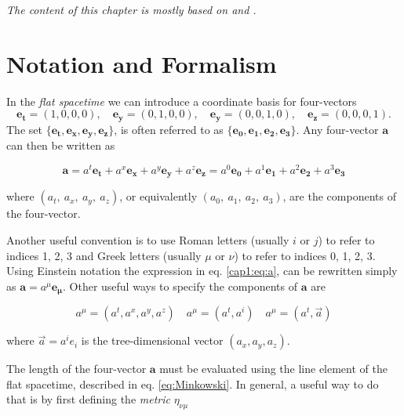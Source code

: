 
\textit{The content of this chapter is mostly based on
 and .}


\section{Notation and Formalism}
\label{cap1:ssec:notation}

In the \textit{flat spacetime} we can introduce a coordinate basis for
four-vectors
\begin{equation}
    \mathbf{e_t} = (1,0,0,0), \quad
    \mathbf{e_y} = (0,1,0,0), \quad
    \mathbf{e_y} = (0,0,1,0), \quad
    \mathbf{e_z} = (0,0,0,1).
    \label{cap1:eq:coord_base}
\end{equation}
The set 
$\{ \mathbf{e_t}, \mathbf{e_x}, \mathbf{e_y}, \mathbf{e_z} \}$, is often
referred to as $\{ \mathbf{e_0}, \mathbf{e_1}, \mathbf{e_2}, \mathbf{e_3} \}$.
Any four-vector $\textbf{a}$ can then be written as

\begin{equation}
    \textbf{a}
    = a^t \mathbf{e_t} + a^x \mathbf{e_x} + a^y \mathbf{e_y} + a^z \mathbf{e_z}
    = a^0 \mathbf{e_0} + a^1 \mathbf{e_1} + a^2 \mathbf{e_2} + a^3 \mathbf{e_3}
    \label{cap1:eq:a}
\end{equation}

where $(a_t,~a_x,~a_y,~a_z)$, or equivalently $(a_0,~a_1,~a_2,~a_3)$, are the
components of the four-vector.

Another useful convention is to use Roman letters (usually $i$ or $j$) to refer
to indices 1, 2, 3 and Greek letters (usually $\mu$ or $\nu$) to refer to
indices 0, 1, 2, 3.
Using Einstein notation the expression in eq. \ref{cap1:eq:a}, can be rewritten
simply as $\textbf{a} = a^\mu \mathbf {e_\mu}$.
Other useful ways to specify the components of $\textbf{a}$ are

\begin{equation*}
    a^\mu = (a^t, a^x, a^y, a^z) \quad a^\mu = (a^t, a^i) \quad a^\mu
    = (a^t, \vec a)
\end{equation*}

where $\vec a = a^i e_i$ is the tree-dimensional vector $(a_x, a_y, a_z)$.

The length of the four-vector $\mathbf{a}$ must be evaluated using the line
element of the flat spacetime, described in eq. \ref{eq:Minkowski}.
In general, a useful way to do that is by first defining the \textit{metric}
$\eta_{\nu \mu}$

